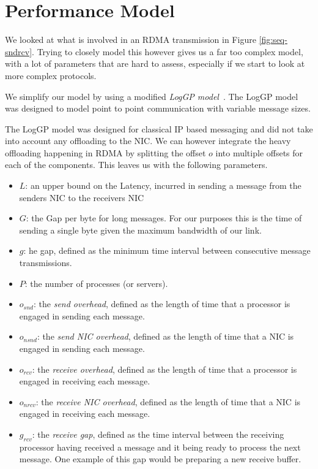 \section{Performance Model}\label{sec:perf-model} \label{sec:model}

We looked at what is involved in an RDMA transmission in Figure \ref{fig:seq-sndrcv}.
Trying to closely model this however gives us a far too complex model, with a lot of parameters that are hard to assess,
especially if we start to look at more complex protocols. 

We simplify our model by using a modified \emph{LogGP model}~\cite{}. The LogGP model was designed to model point to point
communication with variable message sizes. 


The LogGP model was designed for classical IP based messaging and did not take into account any offloading to the NIC. We 
can however integrate the heavy offloading happening in RDMA by splitting the offset $o$ into multiple offsets for each
of the components. This leaves us with the following parameters.


\begin{itemize}
  \item $L$: an upper bound on the Latency, incurred in sending a message from the senders NIC to the receivers NIC
  \item $G$: the Gap per byte for long messages. For our purposes this is the time of sending a single byte given the 
    maximum bandwidth of our link.
  \item $g$: he gap, defined as the minimum time interval between consecutive message transmissions.
  \item $P$: the number of processes (or servers).
  \item $o_{snd}$: the \emph{send overhead}, defined as the length of time that a processor is engaged in sending each message.
  \item $o_{nsnd}$: the \emph{send NIC overhead}, defined as the length of time that a NIC is engaged in sending each message.
  \item $o_{rcv}$: the \emph{receive overhead}, defined as the length of time that a processor is engaged in receiving each message.
  \item $o_{nrcv}$: the \emph{receive NIC overhead}, defined as the length of time that a NIC is engaged in receiving each message.
  \item $g_{rcv}$: the \emph{receive gap}, defined as the time interval between the receiving processor having received a message 
    and it being ready to process the next message. One example of this gap would be preparing a new receive buffer.
\end{itemize}

